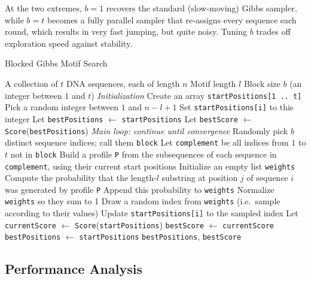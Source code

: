 \documentclass{article}
\begin{document}
At the two extremes, \(b=1\) recovers the standard (slow‐moving) Gibbs sampler, while \(b=t\) becomes a fully parallel sampler that re‐assigns every sequence each round, which results in very fast jumping, but quite noisy.  Tuning \(b\) trades off exploration speed against stability.

\begin{algorithm}[ht]
\caption{Blocked Gibbs Motif Search}
\label{alg:blocked-gibbs-wordy}
\begin{algorithmic}[1]
\Require A collection of $t$ DNA sequences, each of length $n$
\Require Motif length $l$
\Require Block size $b$ (an integer between $1$ and $t$)
\Statex
\Comment \emph{Initialization}
\State Create an array \texttt{startPositions[1\,..\,t]}
  \State Pick a random integer between $1$ and $n - l + 1$
  \State Set \texttt{startPositions[i]} to this integer
\EndFor
\State Let \texttt{bestPositions} $\gets$ \texttt{startPositions}
\State Let \texttt{bestScore} $\gets$ \texttt{Score}(\texttt{bestPositions})
\Statex
\Comment \emph{Main loop: continue until convergence}
  \State Randomly pick $b$ distinct sequence indices; call them \texttt{block}
  \State Let \texttt{complement} be all indices from $1$ to $t$ not in \texttt{block}
  \State Build a profile \texttt{P} from the subsequences of each sequence in \texttt{complement}, using their current start positions
    \State Initialize an empty list \texttt{weights}
      \State Compute the probability that the length‑$l$ substring at position $j$ of sequence $i$ was generated by profile \texttt{P}
      \State Append this probability to \texttt{weights}
    \EndFor
    \State Normalize \texttt{weights} so they sum to 1
    \State Draw a random index from \texttt{weights} (i.e.\ sample according to their values)
    \State Update \texttt{startPositions[i]} to the sampled index
  \EndFor
  \State Let \texttt{currentScore} $\gets$ \texttt{Score}(\texttt{startPositions})
    \State \texttt{bestScore} $\gets$ \texttt{currentScore}
    \State \texttt{bestPositions} $\gets$ \texttt{startPositions}
  \EndIf
\EndWhile
\State \Return \texttt{bestPositions}, \texttt{bestScore}
\end{algorithmic}
\end{algorithm}

\subsection*{Performance Analysis}
\end{document}
